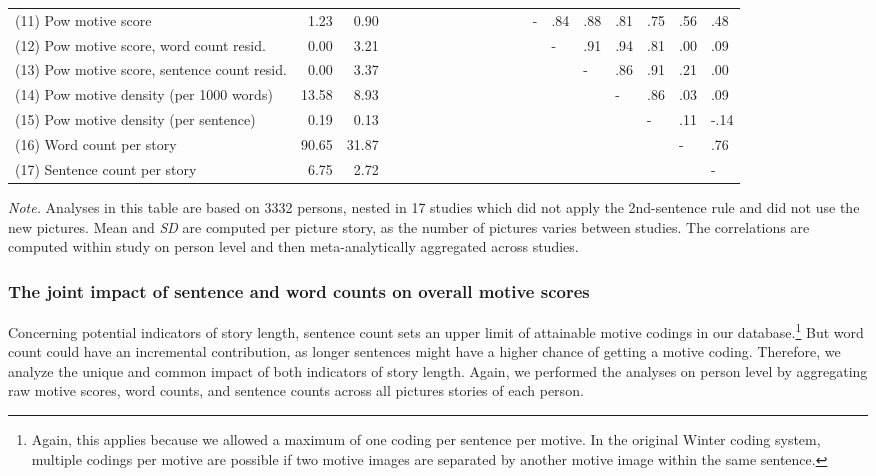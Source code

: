 \documentclass[man,a4paper,mask]{apa6}\usepackage[]{graphicx}\usepackage[]{color}
\begin{document}
\begin{table}
\begin{threeparttable}
\begin{tabularx}{\textwidth}{Xrrlllllllllllllllll}
  (11) Pow motive score & 1.23 & 0.90 &  &  &  &  &  &  &  &  &  &  & - & .84 & .88 & .81 & .75 & .56 & .48 \\ 
  (12) Pow motive score, word count resid. & 0.00 & 3.21 &  &  &  &  &  &  &  &  &  &  &  & - & .91 & .94 & .81 & .00 & .09 \\ 
  (13) Pow motive score, sentence count resid. & 0.00 & 3.37 &  &  &  &  &  &  &  &  &  &  &  &  & - & .86 & .91 & .21 & .00 \\ 
  (14) Pow motive density (per 1000 words) & 13.58 & 8.93 &  &  &  &  &  &  &  &  &  &  &  &  &  & - & .86 & .03 & .09 \\ 
  (15) Pow motive density (per sentence) & 0.19 & 0.13 &  &  &  &  &  &  &  &  &  &  &  &  &  &  & - & .11 & -.14 \\ 
  (16) Word count per story & 90.65 & 31.87 &  &  &  &  &  &  &  &  &  &  &  &  &  &  &  & - & .76 \\ 
  (17) Sentence count per story & 6.75 & 2.72 &  &  &  &  &  &  &  &  &  &  &  &  &  &  &  &  & - \\ 
   \hline

		\bottomrule
		\end{tabularx}
		\begin{tablenotes}[para,flushleft]
			{\small
			\vspace*{0.75em}
			\textit{Note.} Analyses in this table are based on 3332 persons, nested in 17 studies which did not apply the 2nd-sentence rule and did not use the new pictures. Mean and \emph{SD} are computed per picture story, as the number of pictures varies between studies. The correlations are computed within study on person level and then meta-analytically aggregated across studies.}
	      \end{tablenotes}
	  \end{threeparttable}
\end{table}


\subsubsection{The joint impact of sentence and word counts on overall motive scores}
Concerning potential indicators of story length, sentence count sets an upper limit of attainable motive codings in our database.\footnote{Again, this applies because we allowed a maximum of one coding per sentence per motive. In the original Winter coding system, multiple codings per motive are possible if two motive images are separated by another motive image within the same sentence.} But word count could have an incremental contribution, as longer sentences might have a higher chance of getting a motive coding. Therefore, we analyze the unique and common impact of both indicators of story length. Again, we performed the analyses on person level by aggregating raw motive scores, word counts, and sentence counts across all pictures stories of each person.
\end{document}
